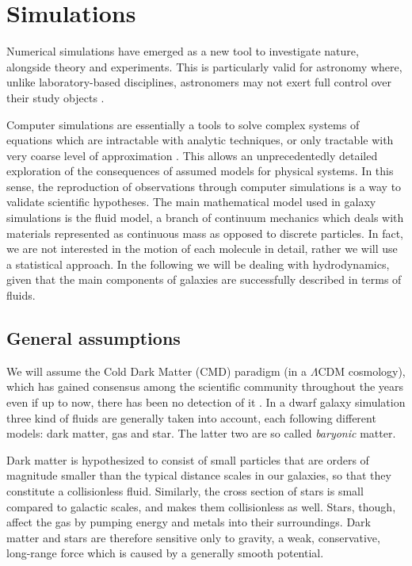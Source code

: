 
\chapter{Simulations}
\label{ch:simulations}

Numerical simulations have emerged as a new tool to investigate nature, alongside theory and experiments.
This is particularly valid for astronomy where, unlike laboratory-based disciplines, astronomers may not exert full control over their study objects \citep{Heng2014}.

Computer simulations are essentially a tools to solve complex systems of equations which are intractable with analytic techniques, or only tractable with very coarse level of approximation \citep{Springel2015}.
This allows an unprecedentedly detailed exploration of the consequences of assumed models for physical systems.
In this sense, the reproduction of observations through computer simulations is a way to validate scientific hypotheses.
The main mathematical model used in galaxy simulations is the fluid model, a branch of continuum mechanics which deals with materials represented as continuous mass as opposed to discrete particles.
In fact, we are not interested in the motion of each molecule in detail, rather we will use a statistical approach.
In the following we will be dealing with hydrodynamics, given that the main components of galaxies are successfully described in terms of fluids.

\section{General assumptions}
We will assume the Cold Dark Matter (CMD) paradigm (in a $\Lambda$CDM cosmology), which has gained consensus among the scientific community throughout the years even if up to now, there has been no detection of it \citep[see e.g.][for an extensive and historical overview]{Einasto2010}.
In a dwarf galaxy simulation three kind of fluids are generally taken into account, each following different models: dark matter, gas and star. The latter two are so called \emph{baryonic} matter.

Dark matter is hypothesized to consist of small particles that are orders of magnitude smaller than the typical distance scales in our galaxies, so that they constitute a collisionless fluid.
Similarly, the cross section of stars is small compared to galactic scales, and makes them collisionless as well.
Stars, though, affect the gas by pumping energy and metals into their surroundings.
Dark matter and stars are therefore sensitive only to gravity, a weak, conservative, long-range force which is caused by a generally smooth potential.

